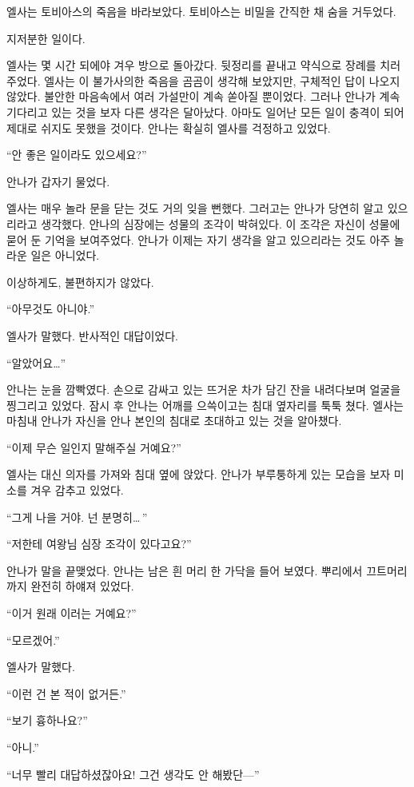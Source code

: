 엘사는 토비아스의 죽음을 바라보았다. 토비아스는 비밀을 간직한 채 숨을 거두었다.

\textbreak

지저분한 일이다.

엘사는 몇 시간 되에야 겨우 방으로 돌아갔다. 뒷정리를 끝내고 약식으로 장례를 치러주었다. 엘사는 이 불가사의한 죽음을 곰곰이 생각해 보았지만, 구체적인 답이 나오지 않았다. 불안한 마음속에서 여러 가설만이 계속 쏟아질 뿐이었다. 그러나 안나가 계속 기다리고 있는 것을 보자 다른 생각은 달아났다. 아마도 일어난 모든 일이 충격이 되어 제대로 쉬지도 못했을 것이다. 안나는 확실히 엘사를 걱정하고 있었다.

``안 좋은 일이라도 있으세요?''

안나가 갑자기 물었다.

엘사는 매우 놀라 문을 닫는 것도 거의 잊을 뻔했다. 그러고는 안나가 당연히 알고 있으리라고 생각했다. 안나의 심장에는 성물의 조각이 박혀있다. 이 조각은 자신이 성물에 묻어 둔 기억을 보여주었다. 안나가 이제는 자기 생각을 알고 있으리라는 것도 아주 놀라운 일은 아니었다.

이상하게도, 불편하지가 않았다.

``아무것도 아니야.''

엘사가 말했다. 반사적인 대답이었다.

``알았어요\ldots''

안나는 눈을 깜빡였다. 손으로 감싸고 있는 뜨거운 차가 담긴 잔을 내려다보며 얼굴을 찡그리고 있었다. 잠시 후 안나는 어깨를 으쓱이고는 침대 옆자리를 툭툭 쳤다. 엘사는 마침내 안나가 자신을 안나 본인의 침대로 초대하고 있는 것을 알아챘다.

``이제 무슨 일인지 말해주실 거예요?''

엘사는 대신 의자를 가져와 침대 옆에 앉았다. 안나가 부루퉁하게 있는 모습을 보자 미소를 겨우 감추고 있었다.

``그게 나을 거야. 넌 분명히\ldots\,''

``저한테 여왕님 심장 조각이 있다고요?''

안나가 말을 끝맺었다. 안나는 남은 흰 머리 한 가닥을 들어 보였다. 뿌리에서 끄트머리까지 완전히 하얘져 있었다.

``이거 원래 이러는 거예요?''

``모르겠어.''

엘사가 말했다.

``이런 건 본 적이 없거든.''

``보기 흉하나요?''

``아니.''

``너무 빨리 대답하셨잖아요! 그건 생각도 안 해봤단—''

